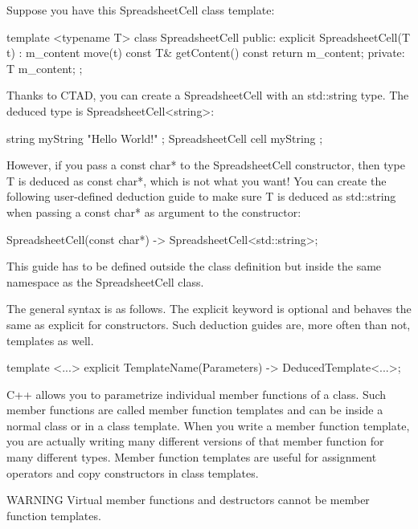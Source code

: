 Suppose you have this SpreadsheetCell class template:

\begin{cpp}
template <typename T>
class SpreadsheetCell
{
    public:
        explicit SpreadsheetCell(T t) : m_content { move(t) } { }
        const T& getContent() const { return m_content; }
    private:
        T m_content;
};
\end{cpp}

Thanks to CTAD, you can create a SpreadsheetCell with an std::string type. The deduced type is SpreadsheetCell<string>:

\begin{cpp}
string myString { "Hello World!" };
SpreadsheetCell cell { myString };
\end{cpp}

However, if you pass a const char* to the SpreadsheetCell constructor, then type T is deduced as const char*, which is not what you want! You can create the following user-defined deduction guide to make sure T is deduced as std::string when passing a const char* as argument to the constructor:

\begin{cpp}
SpreadsheetCell(const char*) -> SpreadsheetCell<std::string>;
\end{cpp}

This guide has to be defined outside the class definition but inside the same namespace as the SpreadsheetCell class.

The general syntax is as follows. The explicit keyword is optional and behaves the same as explicit for constructors. Such deduction guides are, more often than not, templates as well.

\begin{cpp}
template <...>
explicit TemplateName(Parameters) -> DeducedTemplate<...>;
\end{cpp}


C++ allows you to parametrize individual member functions of a class. Such member functions are called member function templates and can be inside a normal class or in a class template. When you write a member function template, you are actually writing many different versions of that member function for many different types. Member function templates are useful for assignment operators and copy constructors in class templates.

\begin{myWarning}{WARNING}
Virtual member functions and destructors cannot be member function templates.
\end{myWarning}

